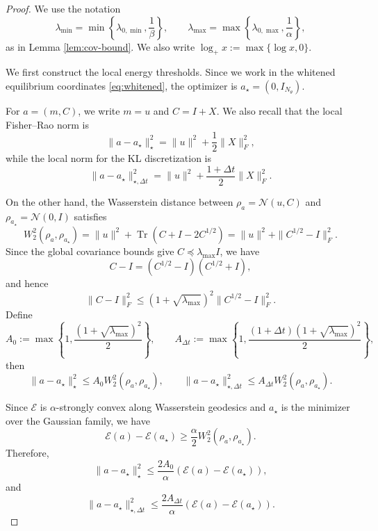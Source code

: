 \documentclass[11pt]{article}
\theoremstyle{plain}
\theoremstyle{definition}
\theoremstyle{remark}
\newcommand{\Tr}{\operatorname{Tr}}
\begin{document}
\begin{proof}
    We use the notation 
    \[
        \lambda_{\min} = \min \left\{ \lambda_{0,\min}, \frac{1}{\beta} \right\},
        \qquad
        \lambda_{\max} = \max \left\{ \lambda_{0,\max}, \frac{1}{\alpha} \right\},
    \]
    as in Lemma \ref{lem:cov-bound}. We also write $\log_+ x := \max\{\log x, 0\}$.

    We first construct the local energy thresholds. Since we work in the whitened equilibrium coordinates \eqref{eq:whitened}, the optimizer is $a_\star = (0, I_{N_\theta})$.
    
    For $a=(m,C)$, we write $m = u$ and $C = I + X$. We also recall that the local Fisher--Rao norm is
    \[
        \|a-a_\star\|_\star^2
        =
        \|u\|^2+\frac12\|X\|_F^2,
    \]
    while the local norm for the KL discretization is
    \[
        \|a-a_\star\|_{\star,\Delta t}^2
        =
        \|u\|^2+\frac{1+\Delta t}{2}\|X\|_F^2.
    \]

    On the other hand, the Wasserstein distance between $\rho_a=\mathcal N(u,C)$ and $\rho_{a_\star}=\mathcal N(0,I)$ satisfies
    \[
        W_2^2(\rho_a,\rho_{a_\star})
        =
        \|u\|^2
        +
        \Tr(C+I-2C^{1/2})
        =
        \|u\|^2+\|C^{1/2}-I\|_F^2.
    \]
    Since the global covariance bounds give $C\preceq \lambda_{\max} I$, we have
    \[
        C-I = (C^{1/2}-I)(C^{1/2}+I),
    \]
    and hence
    \[
        \|C-I\|_F^2
        \leq
        (1+\sqrt{\lambda_{\max}})^2
        \|C^{1/2}-I\|_F^2.
    \]
    Define
    \[
        A_0
        :=
        \max\left\{
            1,
            \frac{(1+\sqrt{\lambda_{\max}})^2}{2}
        \right\}, \qquad
        A_{\Delta t}
        :=
        \max\left\{
            1,
            \frac{(1+\Delta t)(1+\sqrt{\lambda_{\max}})^2}{2}
        \right\},
    \]
    then
    \[
        \|a-a_\star\|_\star^2
        \leq
        A_0 W_2^2(\rho_a,\rho_{a_\star}), \qquad
        \|a-a_\star\|_{\star,\Delta t}^2
        \leq
        A_{\Delta t} W_2^2(\rho_a,\rho_{a_\star}).
    \]

    Since $\mathcal E$ is $\alpha$-strongly convex along Wasserstein geodesics and $a_\star$ is the minimizer over the Gaussian family, we have
    \[
        \mathcal E(a)-\mathcal E(a_\star)
        \geq
        \frac{\alpha}{2}
        W_2^2(\rho_a,\rho_{a_\star}).
    \]
    Therefore,
    \[
        \|a-a_\star\|_\star^2
        \leq
        \frac{2A_0}{\alpha}
        \left(
            \mathcal E(a)-\mathcal E(a_\star)
        \right),
    \]
    and
    \[
        \|a-a_\star\|_{\star,\Delta t}^2
        \leq
        \frac{2A_{\Delta t}}{\alpha}
        \left(
            \mathcal E(a)-\mathcal E(a_\star)
        \right).
    \]


\end{proof}
\end{document}
